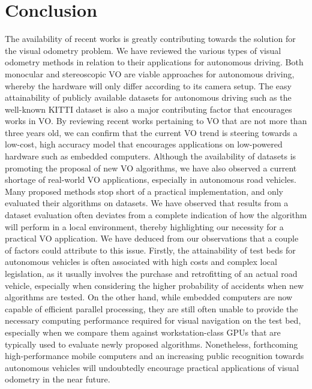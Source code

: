 \section{Conclusion}
The availability of recent works is greatly contributing towards the solution for the visual odometry problem. We have reviewed the various types of visual odometry methods in relation to their applications for autonomous driving. Both monocular and stereoscopic VO are viable approaches for autonomous driving, whereby the hardware will only differ according to its camera setup. The easy attainability of publicly available datasets for autonomous driving such as the well-known KITTI dataset is also a major contributing factor that encourages works in VO. By reviewing recent works pertaining to VO that are not more than three years old, we can confirm that the current VO trend is steering towards a low-cost, high accuracy model that encourages applications on low-powered hardware such as embedded computers. Although the availability of datasets is promoting the proposal of new VO algorithms, we have also observed a current shortage of real-world VO applications, especially in autonomous road vehicles. Many proposed methods stop short of a practical implementation, and only evaluated their algorithms on datasets. We have observed that results from a dataset evaluation often deviates from a complete indication of how the algorithm will perform in a local environment, thereby highlighting our necessity for a practical VO application. We have deduced from our observations that a couple of factors could attribute to this issue. Firstly, the attainability of test beds for autonomous vehicles is often associated with high costs and complex local legislation, as it usually involves the purchase and retrofitting of an actual road vehicle, especially when considering the higher probability of accidents when new algorithms are tested. On the other hand, while embedded computers are now capable of efficient parallel processing, they are still often unable to provide the necessary computing performance required for visual navigation on the test bed, especially when we compare them against workstation-class GPUs that are typically used to evaluate newly proposed algorithms. Nonetheless, forthcoming high-performance mobile computers and an increasing public recognition towards autonomous vehicles will undoubtedly encourage practical applications of visual odometry in the near future.
